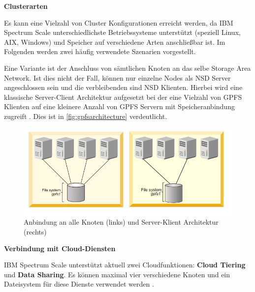 \textbf{Clusterarten}

Es kann eine Vielzahl von Cluster Konfigurationen erreicht werden, da IBM Spectrum Scale unterschiedlichste Betriebssysteme unterstützt (speziell Linux, AIX, Windows) und Speicher auf verschiedene Arten anschließbar ist. Im Folgenden werden zwei häufig verwendete Szenarien vorgestellt.

Eine Variante ist der Anschluss von sämtlichen Knoten an das selbe Storage Area Network. Ist dies nicht der Fall, können nur einzelne Nodes als \ac{NSD} Server angeschlossen sein und die verbleibenden sind \ac{NSD} Klienten. Hierbei wird eine klassische Server-Client Architektur aufgesetzt bei der eine Vielzahl von GPFS Klienten auf eine kleinere Anzahl von GPFS Servern mit Speicheranbindung zugreift \parencite[S. 8]{ibm.2017}. Dies ist in \autoref{fig:gpfsarchitecture} verdeutlicht.

\begin{figure}[hbt]
	\centering
	\includegraphics[scale=0.6]{images/gpfs-architectures}
	\caption{Anbindung an alle Knoten (links) und Server-Klient Architektur (rechts) \parencite[S. 8]{ibm.2017}}
	\label{fig:gpfsarchitecture}
\end{figure}

\textbf{Verbindung mit Cloud-Diensten}

IBM Spectrum Scale unterstützt aktuell zwei Cloudfunktionen: \textbf{Cloud Tiering} und \textbf{Data Sharing}. Es können maximal vier verschiedene Knoten und ein Dateisystem für diese Dienste verwendet werden \parencite{mani.2017}.

